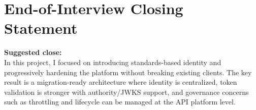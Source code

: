 \documentclass[11pt,a4paper]{article}
\begin{document}
\section{End-of-Interview Closing Statement}
\textbf{Suggested close:}\\
In this project, I focused on introducing standards-based identity and progressively hardening the platform without breaking existing clients. The key result is a migration-ready architecture where identity is centralized, token validation is stronger with authority/JWKS support, and governance concerns such as throttling and lifecycle can be managed at the API platform level.
\end{document}
